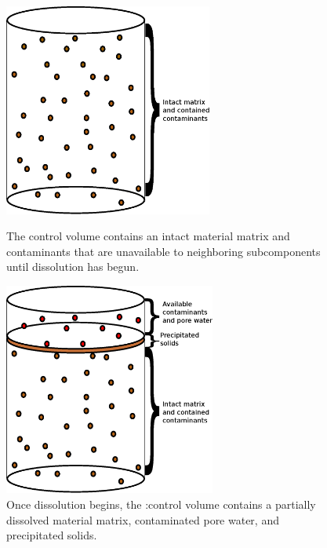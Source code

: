 \begin{figure}[h!]
\begin{minipage}[b]{0.5\linewidth}
  \begin{center}
    \includegraphics[height=7cm]{./chapters/nuclide_models/mixed_cell/mixed_cell_whole.eps}
  \end{center}
  \caption[Intact Mixed Cell Control Volume]{The control volume contains an 
  intact material matrix and contaminants that are unavailable to neighboring 
  subcomponents until dissolution has begun.}
  \label{fig:intact}
\end{minipage}
\hspace{0.5cm}
\begin{minipage}[b]{0.5\linewidth}
  \begin{center}
    \includegraphics[height=7cm]{./chapters/nuclide_models/mixed_cell/mixed_cell_degraded.eps}
  \end{center}
  \caption[Degrading Mixed Cell Control Volume]{Once dissolution begins, the 
  :control volume contains a partially dissolved material matrix, contaminated 
  pore water, and precipitated solids.}
  \label{fig:dissolved}
\end{minipage}
\end{figure}

